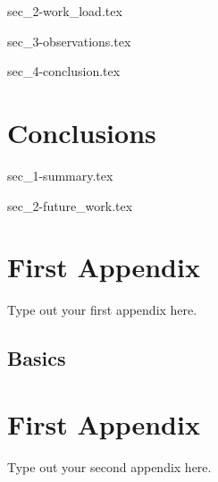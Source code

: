 \documentclass[a4paper,oneside,12pt]{report}
\begin{document}
{sec_2-work_load.tex}
\label{se:work_load}

{sec_3-observations.tex}
\label{se:observations}

{sec_4-conclusion.tex}
\label{se:conclusion}

\chapter{Conclusions}
\label{ch:conc}

{sec_1-summary.tex}

{sec_2-future_work.tex}

\appendix
\chapter{First Appendix}
Type out your first appendix here.
\section{Basics}

\chapter{First Appendix}
Type out your second appendix here.

\graphicspath{ {./images/} }



\end{document}
